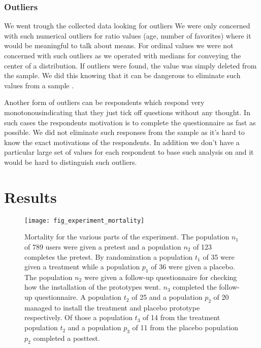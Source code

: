 \subsubsection{Outliers}

We went trough the collected data looking for outliers
\dash{}
We were only concerned with such numerical outliers for ratio values
(age, number of favorites) where it would be meaningful to talk about means.
For ordinal values we were not concerned with such outliers as we operated
with medians for conveying the center of a distribution.
If outliers were found, the value was simply deleted from the sample. We did
this knowing that it can be dangerous to eliminate such values from a sample
\citep[]{greene03}.

Another form of outliers can be respondents which respond very
monotonous\dash{}indicating that they just tick off questions without any
thought. In such cases the respondents motivation is to complete the
questionnaire as fast as possible. We did not eliminate such responses from
the sample as it's hard to know the exact motivations of the respondents.
In addition we don't have a particular large set of values for each respondent
to base such analysis on and it would be hard to distinguish such outliers.

\section{Results}

\begin{figure}
  \texttt{[image: fig\_experiment\_mortality]}
  \caption[Experiment Mortality]{
    Mortality for the various parts of the experiment.
    The population $n_1$ of 789 \urort{} users were given a pretest and
    a population $n_2$ of 123 completes the pretest.
    By randomization a population $t_1$ of 35 were given a treatment while
    a population $p_1$ of 36 were given a placebo.
    The population $n_2$ were given a follow-up questionnaire for checking
    how the installation of the prototypes went. $n_3$ completed the follow-up
    questionnaire.
    A population $t_2$ of 25 and a population $p_2$ of 20 managed to install
    the treatment and placebo prototype respectively.
    Of those a population $t_3$ of 14 from the treatment population $t_2$ and
    a population $p_3$ of 11 from the placebo population $p_2$ completed
    a posttest.
  }
  \label{figure:fig.experiment.setup}
\end{figure}

